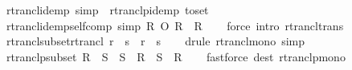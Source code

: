 \begin{isabellebody}
\isamarkupfalse%
%
\endisatagproof
{\isafoldproof}%
%
\isadelimproof
\isanewline
%
\endisadelimproof
\isanewline
{}\isamarkupfalse%
\ rtrancl{\isacharunderscore}{\kern0pt}idemp\ {\isacharbrackleft}{\kern0pt}simp{\isacharbrackright}{\kern0pt}\ {\isacharequal}{\kern0pt}\ rtranclp{\isacharunderscore}{\kern0pt}idemp\ {\isacharbrackleft}{\kern0pt}to{\isacharunderscore}{\kern0pt}set{\isacharbrackright}{\kern0pt}\isanewline
\isanewline
{}\isamarkupfalse%
\ rtrancl{\isacharunderscore}{\kern0pt}idemp{\isacharunderscore}{\kern0pt}self{\isacharunderscore}{\kern0pt}comp\ {\isacharbrackleft}{\kern0pt}simp{\isacharbrackright}{\kern0pt}{\isacharcolon}{\kern0pt}\ {\isachardoublequoteopen}R\isactrlsup {\isacharasterisk}{\kern0pt}\ O\ R\isactrlsup {\isacharasterisk}{\kern0pt}\ {\isacharequal}{\kern0pt}\ R\isactrlsup {\isacharasterisk}{\kern0pt}{\isachardoublequoteclose}\isanewline
%
\isadelimproof
\ \ %
\endisadelimproof
%
\isatagproof
{}\isamarkupfalse%
\ {\isacharparenleft}{\kern0pt}force\ intro{\isacharcolon}{\kern0pt}\ rtrancl{\isacharunderscore}{\kern0pt}trans{\isacharparenright}{\kern0pt}%
\endisatagproof
{\isafoldproof}%
%
\isadelimproof
\isanewline
%
\endisadelimproof
\isanewline
{}\isamarkupfalse%
\ rtrancl{\isacharunderscore}{\kern0pt}subset{\isacharunderscore}{\kern0pt}rtrancl{\isacharcolon}{\kern0pt}\ {\isachardoublequoteopen}r\ {\isasymsubseteq}\ s\isactrlsup {\isacharasterisk}{\kern0pt}\ {\isasymLongrightarrow}\ r\isactrlsup {\isacharasterisk}{\kern0pt}\ {\isasymsubseteq}\ s\isactrlsup {\isacharasterisk}{\kern0pt}{\isachardoublequoteclose}\isanewline
%
\isadelimproof
\ \ %
\endisadelimproof
%
\isatagproof
{}\isamarkupfalse%
\ {\isacharparenleft}{\kern0pt}drule\ rtrancl{\isacharunderscore}{\kern0pt}mono{\isacharcomma}{\kern0pt}\ simp{\isacharparenright}{\kern0pt}%
\endisatagproof
{\isafoldproof}%
%
\isadelimproof
\isanewline
%
\endisadelimproof
\isanewline
{}\isamarkupfalse%
\ rtranclp{\isacharunderscore}{\kern0pt}subset{\isacharcolon}{\kern0pt}\ {\isachardoublequoteopen}R\ {\isasymle}\ S\ {\isasymLongrightarrow}\ S\ {\isasymle}\ R\isactrlsup {\isacharasterisk}{\kern0pt}\isactrlsup {\isacharasterisk}{\kern0pt}\ {\isasymLongrightarrow}\ S\isactrlsup {\isacharasterisk}{\kern0pt}\isactrlsup {\isacharasterisk}{\kern0pt}\ {\isacharequal}{\kern0pt}\ R\isactrlsup {\isacharasterisk}{\kern0pt}\isactrlsup {\isacharasterisk}{\kern0pt}{\isachardoublequoteclose}\isanewline
%
\isadelimproof
\ \ %
\endisadelimproof
%
\isatagproof
{}\isamarkupfalse%
\ {\isacharparenleft}{\kern0pt}fastforce\ dest{\isacharcolon}{\kern0pt}\ rtranclp{\isacharunderscore}{\kern0pt}mono{\isacharparenright}{\kern0pt}%

\end{isabellebody}
